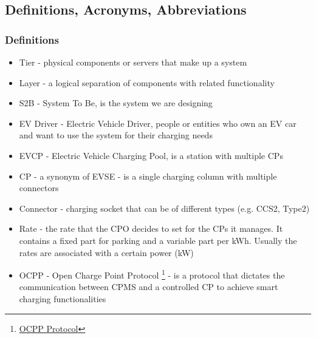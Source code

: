\subsection{Definitions, Acronyms, Abbreviations}
\subsubsection{Definitions}
\begin{itemize}
    \item Tier -  physical components or servers that make up a system
    \item Layer - a logical separation of components with related functionality
    \item S2B - System To Be, is the system we are designing
    \item EV Driver - Electric Vehicle Driver, people or entities who own an EV car and want to use the
          system for their charging needs
    \item EVCP - Electric Vehicle Charging Pool, is a station with multiple CPs
    \item CP - a synonym of EVSE - is a single charging column with multiple connectors
    \item Connector - charging socket that can be of different types (e.g. CCS2, Type2)
    \item Rate - the rate that the CPO decides to set for the CPs it manages. It contains a fixed part for
          parking and a variable part per kWh. Usually the rates are associated with a certain power (kW)
    \item OCPP - Open Charge Point Protocol \footnote{\href{https://www.openchargealliance.org/protocols/ocpp-201/}{OCPP Protocol}} - is a protocol that dictates the communication between CPMS and a controlled CP to achieve smart charging functionalities

\end{itemize}


